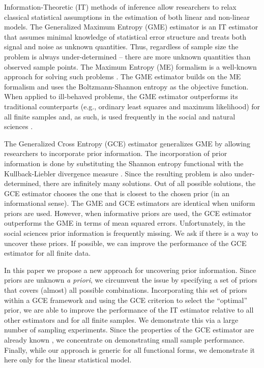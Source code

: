 \documentclass{elsarticle}
\begin{document}
Information-Theoretic (IT) methods of inference allow researchers to relax 
classical statistical assumptions in the estimation of both linear and non-linear models.
The Generalized Maximum Entropy (GME) estimator is an IT estimator that assumes 
minimal knowledge of statistical error structure and treats both signal and noise 
as unknown quantities. 
Thus, regardless of sample size the problem is always under-determined -- there are 
more unknown quantities than observed sample points. 
The Maximum Entropy (ME) formalism is a well-known approach for solving such problems
\citep{jaynes1957a, jaynes1957b}. 
The GME estimator builds on the ME formalism and uses the Boltzmann-Shannon entropy 
\citep{shannon1948} as the objective function.
When applied to ill-behaved problems, the GME estimator 
outperforms its traditional counterparts (e.g., ordinary least squares and maximum likelihood) 
for all finite samples and, as such, is used frequently in the social and natural sciences
\citep{golan1996}. 

The Generalized Cross Entropy (GCE) estimator generalizes GME by allowing 
researchers to incorporate prior information. 
The incorporation of prior information is done by substituting the Shannon entropy 
functional with the Kullback-Liebler divergence measure \citep{kullback1951}.  
Since the resulting problem is also under-determined, there are infinitely many solutions. 
Out of all possible solutions, the GCE estimator chooses the one that is closest to the 
chosen prior (in an informational sense).
The GME and GCE estimators are identical when uniform priors are used. 
However, when informative priors are used, the GCE estimator outperforms the GME
in terms of mean squared errors. 
Unfortunately, in the social sciences prior information is frequently missing. 
We ask if there is a way to uncover these priors.
If possible, we can improve the performance of the GCE estimator for all 
finite data. 

In this paper we propose a new approach for uncovering prior information. 
Since priors are unknown \emph{a priori}, we circumvent the issue by specifying a 
set of priors that covers (almost) all possible combinations. 
Incorporating this set of priors within a GCE framework and using the GCE criterion to 
select the ``optimal'' prior, we are able to improve the performance of the IT estimator 
relative to all other estimators and for all finite samples.
We demonstrate this via a large number of sampling experiments. 
Since the properties of the GCE estimator are already known \citep{golan1996, 
mittelhammer2000}, we concentrate on demonstrating small sample performance. 
Finally, while our approach is generic for all functional forms, we demonstrate it here 
only for the linear statistical model.
\end{document}
